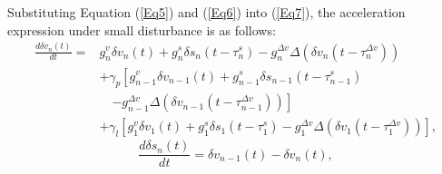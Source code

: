 \documentclass[journal]{IEEEtran}
\begin{document}
Substituting Equation (\ref{Eq5}) and (\ref{Eq6}) into (\ref{Eq7}), the acceleration expression under small disturbance is as follows:
\begin{equation}
  \begin{aligned}
    \frac{d \delta v_{n}(t)}{d t}= & g_{n}^{v} \delta v_{n}(t)+g_{n}^{s} \delta s_{n}\left(t-\tau_{n}^{s}\right)-g_{n}^{\Delta v} \Delta\left(\delta v_{n}\left(t-\tau_{n}^{\Delta v}\right)\right)                          \\
                                   & +\gamma_{p}\left[g_{n-1}^{v} \delta v_{n-1}(t)+g_{n-1}^{s} \delta s_{n-1}\left(t-\tau_{n-1}^{s}\right)\right.                                                                           \\
                                   & \quad\left.-g_{n-1}^{\Delta v} \Delta\left(\delta v_{n-1}\left(t-\tau_{n-1}^{\Delta v}\right)\right)\right]                                                                             \\
                                   & +\gamma_{l}\left[g_{1}^{v} \delta v_{1}(t)+g_{1}^{s} \delta s_{1}\left(t-\tau_{1}^{s}\right)-g_{1}^{\Delta v} \Delta\left(\delta v_{1}\left(t-\tau_{1}^{\Delta v}\right)\right)\right],
  \end{aligned}
  \label{Eq8}
\end{equation}
\begin{equation}
  \frac{d \delta s_{n}(t)}{d t}=\delta v_{n-1}(t)-\delta v_{n}(t),
  \label{Eq9}
\end{equation}
\end{document}
